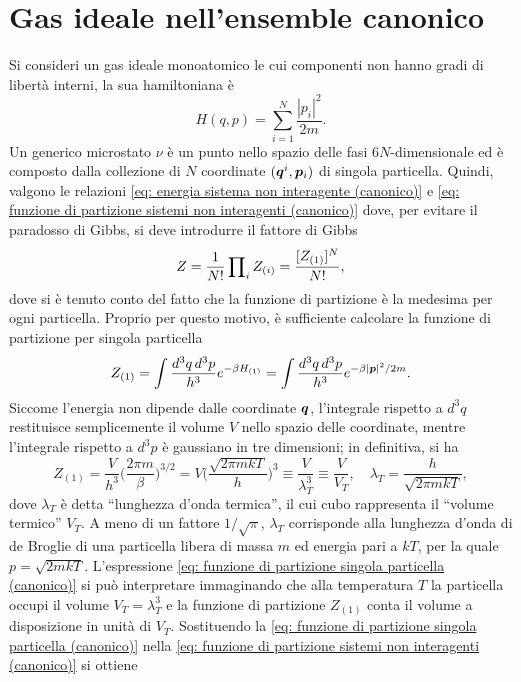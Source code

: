 \section{Gas ideale nell'ensemble canonico}
Si consideri un gas ideale monoatomico le cui componenti non hanno gradi di libertà interni, la sua hamiltoniana è
\begin{equation}
    H(q,p) = \sum_{i = 1}^N\frac{|p_i|^2}{2m}.
\end{equation}
Un generico microstato $\nu$ è un punto nello spazio delle fasi $6N$-dimensionale ed è composto dalla collezione di $N$ coordinate $(\bm{q}^i,\bm{p}_i)$ di singola particella. Quindi, valgono le relazioni \eqref{eq: energia sistema non interagente (canonico)} e \eqref{eq: funzione di partizione sistemi non interagenti (canonico)} dove, per evitare il paradosso di Gibbs, si deve introdurre il fattore di Gibbs
\begin{equation}
    Z = \frac{1}{N!}\prod\nolimits_iZ_{(i)} = \frac{[Z_{(1)}]^N}{N!},
\end{equation}
dove si è tenuto conto del fatto che la funzione di partizione è la medesima per ogni particella. Proprio per questo motivo, è sufficiente calcolare la funzione di partizione per singola particella
\begin{equation}
    Z_{(1)} = \int\frac{d^3q\,d^3p}{h^3}e^{-\beta H_{(1)}} = \int\frac{d^3q\,d^3p}{h^3}e^{-\beta|\bm{p}|^2/2m}.
\end{equation}
Siccome l'energia non dipende dalle coordinate $\bm{q}$, l'integrale rispetto a $d^3q$ restituisce semplicemente il volume $V$ nello spazio delle coordinate, mentre l'integrale rispetto a $d^3p$ è gaussiano in tre dimensioni; in definitiva, si ha
\begin{equation}
\label{eq: funzione di partizione singola particella (canonico)}
    Z_{(1)} = \frac{V}{h^3}\bigg(\frac{2\pi m}{\beta}\bigg)^{3/2} = V\bigg(\frac{\sqrt{2\pi mkT}}{h}\bigg)^3 \equiv \frac{V}{\lambda_T^3} \equiv \frac{V}{V_T},\quad \lambda_T = \frac{h}{\sqrt{2\pi mkT}},
\end{equation}
dove $\lambda_T$ è detta ``lunghezza d'onda termica'', il cui cubo rappresenta il ``volume termico'' $V_T$. A meno di un fattore $1/\sqrt{\pi}$, $\lambda_T$ corrisponde alla lunghezza d'onda di de Broglie di una particella libera di massa $m$ ed energia pari a $kT$, per la quale $p = \sqrt{2mkT}$. L'espressione \eqref{eq: funzione di partizione singola particella (canonico)} si può interpretare immaginando che alla temperatura $T$ la particella occupi il volume $V_T = \lambda_T^3$ e la funzione di partizione $Z_{(1)}$ conta il volume a disposizione in unità di $V_T$. Sostituendo la \eqref{eq: funzione di partizione singola particella (canonico)} nella \eqref{eq: funzione di partizione sistemi non interagenti (canonico)} si ottiene
